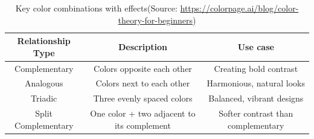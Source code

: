 \begin{table} [H]
    \centering
    \begin{tabular} {|c|c|c|}
        \hline
        \multicolumn{1}{|c|}{\textbf{Relationship Type}} &
        \multicolumn{1}{c|}{\textbf{Description}}  &
        \multicolumn{1}{c|}{\textbf{Use case}}  \\
        
        \hline
        Complementary & Colors opposite each other & Creating bold contrast\\
        \hline
        Analogous & Colors next to each other & Harmonious, natural looks\\
        \hline
        Triadic & Three evenly spaced colors & Balanced, vibrant designs\\
        \hline
        Split Complementary & One color + two adjacent to its complement & Softer contrast than complementary\\
        \hline        
    \end{tabular}
    \caption{Key color combinations with effects(Source: \url{https://colorpage.ai/blog/color-theory-for-beginners})}
    \label{Table:ColorCombinations}
\end{table}

